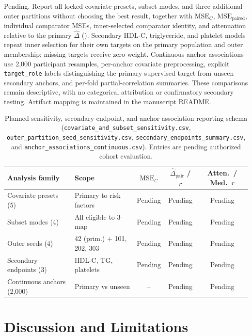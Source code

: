 \documentclass[preprint,12pt]{elsarticle}
\begin{document}
Pending. Report all locked covariate presets, subset modes, and three additional outer partitions without choosing the best result, together with $\mathrm{MSE}_C$, $\mathrm{MSE}_{\text{paired}}$, individual comparator MSEs, inner-selected comparator identity, and attenuation relative to the primary $\widehat{\Delta}$ (). Secondary HDL-C, triglyceride, and platelet models repeat inner selection for their own targets on the primary population and outer membership; missing targets receive zero weight. Continuous anchor associations use 2,000 participant resamples, per-anchor covariate preprocessing, explicit \texttt{target\_role} labels distinguishing the primary supervised target from unseen secondary anchors, and per-fold partial-correlation summaries. These comparisons remain descriptive, with no categorical attribution or confirmatory secondary testing. Artifact mapping is maintained in the manuscript README.

\begin{table}[ht]
\centering
\caption{Planned sensitivity, secondary-endpoint, and anchor-association reporting schema (\texttt{covariate\_and\_subset\_sensitivity.csv}, \texttt{outer\_partition\_seed\_sensitivity.csv}, \texttt{secondary\_endpoints\_summary.csv}, and \texttt{anchor\_associations\_continuous.csv}). Entries are pending authorized cohort evaluation.}
\label{tab:sensitivity_plan}
\footnotesize
\setlength{\tabcolsep}{3.5pt}
\begin{tabularx}{\textwidth}{@{}>{\raggedright\arraybackslash}X l c c c@{}}
\toprule
Analysis family & Scope & $\mathrm{MSE}_C$ & $\widehat{\Delta}_{\text{pair}}$ / $r$ & Atten.\ / Med.\ $r$ \\
\midrule
Covariate presets (5) & Primary to risk factors & Pending & Pending & Pending \\
Subset modes (4) & All eligible to 3-map & Pending & Pending & Pending \\
Outer seeds (4) & 42 (prim.) + 101, 202, 303 & Pending & Pending & Pending \\
Secondary endpoints (3) & HDL-C, TG, platelets & Pending & Pending & Pending \\
Continuous anchors (2,000) & Primary vs unseen & -- & Pending & Pending \\
\bottomrule
\end{tabularx}
\end{table}

\section{Discussion and Limitations}
\label{sec:discussion}
\end{document}
